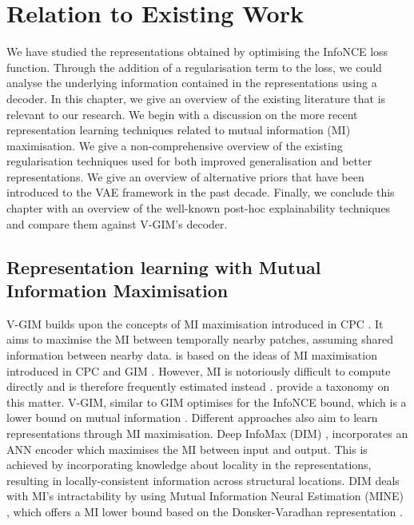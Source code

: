 \chapter{Relation to Existing Work} \label{cha:5}
We have studied the representations obtained by optimising the InfoNCE loss function. Through the addition of a regularisation term to the loss, we could analyse the underlying information contained in the representations using a decoder. In this chapter, we give an overview of the existing literature that is relevant to our research. We begin with a discussion on the more recent representation learning techniques related to mutual information (MI) maximisation. We give a non-comprehensive overview of the existing regularisation techniques used for both improved generalisation and better representations. We give an overview of alternative priors that have been introduced to the VAE framework in the past decade. Finally, we conclude this chapter with an overview of the well-known post-hoc explainability techniques and compare them against V-GIM's decoder.

\section{Representation learning with Mutual Information Maximisation}
	V-GIM builds upon the concepts of MI maximisation introduced in CPC \cite{oordRepresentationLearningContrastive2019}. It aims to maximise the MI between temporally nearby patches, assuming shared information between nearby data. 
	is based on the ideas of MI maximisation introduced in CPC and GIM \citep{lowePuttingEndEndtoEnd2020a, oordRepresentationLearningContrastive2019}. However, MI is notoriously difficult to compute directly and is therefore frequently estimated instead \citep{tschannenMutualInformationMaximization2020}. \cite{pooleVariationalBoundsMutual2019} provide a taxonomy on this matter. V-GIM, similar to GIM optimises for the InfoNCE bound, which is a lower bound on mutual information \cite{oordRepresentationLearningContrastive2019}. Different approaches also aim to learn representations through MI maximisation. Deep InfoMax (DIM) \citep{hjelmLearningDeepRepresentations2019}, incorporates an ANN encoder which maximises the MI between input and output. This is achieved by incorporating knowledge about locality in the representations, resulting in locally-consistent information across structural locations. DIM deals with MI's intractability by using Mutual Information Neural Estimation (MINE) \citep{belghaziMINEMutualInformation2021}, which offers a MI lower bound based on the Donsker-Varadhan representation \citep{donskerAsymptoticEvaluationCertain1976}. 
	
